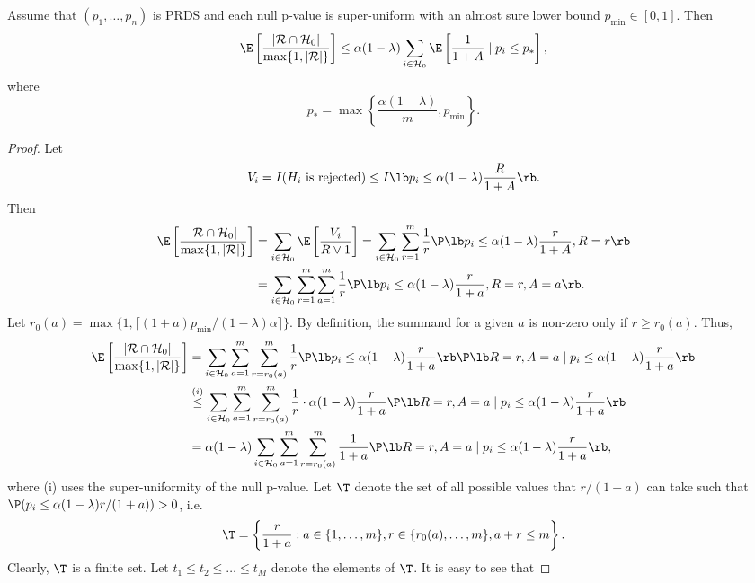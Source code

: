\begin{thm}\label{thm:storey_BH_generic}
Assume that $(p_1, \ldots, p_n)$ is PRDS and each null p-value is super-uniform with an almost sure lower bound $p_{\min}\in [0, 1]$. Then
\[\E\left[\frac{|\mathcal{R} \cap \mathcal{H}_0|}{\max\{1, |\mathcal{R}|\} } \right]\le \alpha(1 - \lambda)\sum_{i\in \mathcal{H}_0}\E\left[\frac{1}{1 + A}\mid p_i\le p_{*}\right],\]
where
\[p_{*} = \max\left\{\frac{\alpha(1 - \lambda)}{m}, p_{\min}\right\}.\]
\end{thm}
\begin{proof}
Let
  \[V_i = I(H_i \text{ is rejected}) \le I\lb p_i \le \alpha(1 - \lambda)\frac{R}{1 + A}\rb.\]
  Then
  \begin{align*}
    \E\left[\frac{|\mathcal{R} \cap \mathcal{H}_0|}{\max\{1, |\mathcal{R}|\} } \right]
    &= \sum_{i\in \mathcal{H}_0}\E\left[\frac{V_i}{R\vee 1}\right] = \sum_{i\in \mathcal{H}_0}\sum_{r = 1}^{m}\frac{1}{r}\P\lb p_i \le \alpha(1 - \lambda)\frac{r}{1 + A}, R = r\rb\\
    & = \sum_{i\in \mathcal{H}_0}\sum_{r = 1}^{m}\sum_{a = 1}^{m}\frac{1}{r}\P\lb p_i \le \alpha(1 - \lambda)\frac{r}{1 + a}, R = r, A = a\rb.
  \end{align*}
   Let $r_0(a) = \max\{1, \lceil(1 + a)p_{\min} / (1 - \lambda)\alpha\rceil\}$. By definition, the summand for a given $a$ is non-zero only if $r\ge r_{0}(a)$. Thus,
  \begin{align*}
    \E\left[\frac{|\mathcal{R} \cap \mathcal{H}_0|}{\max\{1, |\mathcal{R}|\} } \right]
    & = \sum_{i\in \mathcal{H}_0}\sum_{a = 1}^{m}\sum_{r = r_{0}(a)}^{m}\frac{1}{r}\P\lb p_i \le \alpha(1 - \lambda)\frac{r}{1 + a}\rb\P\lb R = r, A = a\mid p_i \le \alpha(1 - \lambda)\frac{r}{1 + a}\rb\\
    & \stackrel{(i)}{\le} \sum_{i\in \mathcal{H}_0}\sum_{a = 1}^{m}\sum_{r = r_0(a)}^{m}\frac{1}{r}\cdot \alpha(1 - \lambda)\frac{r}{1 + a}\P\lb R = r, A = a\mid p_i \le \alpha(1 - \lambda)\frac{r}{1 + a}\rb\\
    & = \alpha(1 - \lambda)\sum_{i\in \mathcal{H}_0}\sum_{a = 1}^{m}\sum_{r = r_{0}(a)}^{m}\frac{1}{1 + a}\P\lb R = r, A = a\mid p_i \le \alpha(1 - \lambda)\frac{r}{1 + a}\rb,
  \end{align*}
  where (i) uses the super-uniformity of the null p-value. Let $\T$ denote the set of all possible values that $r / (1 + a)$ can take such that $\P(p_i \le \alpha(1 - \lambda)r / (1 + a)) > 0$, i.e.
  \[\T = \left\{\frac{r}{1 + a}: a\in \{1, \ldots, m\}, r\in \{r_{0}(a), \ldots, m\}, a + r \le m\right\}.\]
  Clearly, $\T$ is a finite set. Let $t_1\le t_2 \le \ldots \le t_M$ denote the elements of $\T$. It is easy to see that

\end{proof}
